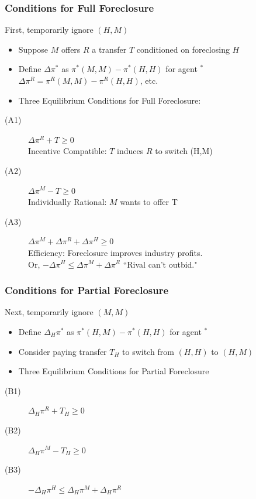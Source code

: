 \documentclass[aspectratio=169,11pt]{beamer}
\begin{document}
\begin{frame}
\frametitle{Conditions for Full Foreclosure}
First, temporarily ignore $(H,M)$
\begin{itemize}
\item Suppose $M$ offers $R$ a transfer $T$ conditioned on foreclosing $H$
\item Define $\Delta \pi^{*}$ as $\pi^*(M,M) - \pi^*(H,H)$ for agent $ ^*$ \\ 
\hspace{0.4in} $\Delta \pi^{R} = \pi^R(M,M) - \pi^R(H,H)$, etc.
\item Three Equilibrium Conditions for Full Foreclosure:
\end{itemize}
\begin{description}
\item[(A1)] $\Delta \pi^R+ T \geq 0$\\
 Incentive Compatible: $T$ induces $R$ to switch (H,M)
\item[(A2)] $\Delta \pi^M - T \geq 0$\\
Individually Rational: $M$ wants to offer T
\item[(A3)] $\Delta \pi^M + \Delta \pi^R + \Delta \pi^H \geq 0$\\
Efficiency: Foreclosure improves industry profits.\\
Or, $-\Delta\pi^H \leq \Delta \pi^M + \Delta \pi^R$ ``Rival can't outbid." 
\end{description}
\end{frame}

\begin{frame}
\frametitle{Conditions for Partial Foreclosure}
Next, temporarily ignore $(M,M)$
\begin{itemize}
\item Define $\Delta_H \pi^{*}$ as $\pi^*(H,M) - \pi^*(H,H)$ for agent $ ^*$ 
\item Consider paying transfer $T_H$ to switch from $(H,H)$ to $(H,M)$
\item Three Equilibrium Conditions for Partial Foreclosure
\end{itemize}
\begin{description}
\item[(B1)] $\Delta_H \pi^R+ T_H \geq 0$
\item[(B2)] $\Delta_H \pi^M - T_H \geq 0$
\item[(B3)]$-\Delta_H\pi^H \leq \Delta_H \pi^M + \Delta_H \pi^R$
\end{description}
\end{frame}
\end{document}
